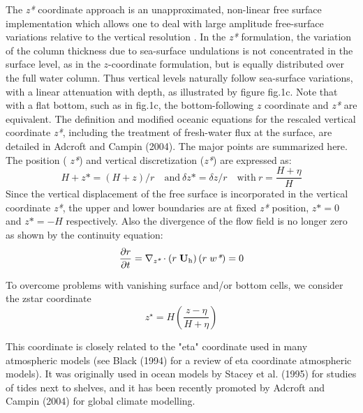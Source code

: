 \documentclass[../main/NEMO_manual]{subfiles}
\begin{document}
The \textit{z*} coordinate approach is an unapproximated, non-linear free surface implementation which allows one to
deal with large amplitude free-surface variations relative to the vertical resolution \citep{Adcroft_Campin_OM04}.
In the \textit{z*} formulation,
the variation of the column thickness due to sea-surface undulations is not concentrated in the surface level,
as in the $z$-coordinate formulation, but is equally distributed over the full water column.
Thus vertical levels naturally follow sea-surface variations, with a linear attenuation with depth,
as illustrated by figure fig.1c.
Note that with a flat bottom, such as in fig.1c, the bottom-following $z$ coordinate and \textit{z*} are equivalent.
The definition and modified oceanic equations for the rescaled vertical coordinate  \textit{z*},
including the treatment of fresh-water flux at the surface, are detailed in Adcroft and Campin (2004).
The major points are summarized here.
The position ( \textit{z*}) and vertical discretization (\textit{z*}) are expressed as:
\[
  H +  \textit{z*} = (H + z) / r \quad \text{and} \ \delta \textit{z*} = \delta z / r \quad \text{with} \ r = \frac{H+\eta} {H}
\] 
Since the vertical displacement of the free surface is incorporated in the vertical coordinate \textit{z*},
the upper and lower boundaries are at fixed  \textit{z*} position,
$\textit{z*} = 0$ and  $\textit{z*} = -H$ respectively.
Also the divergence of the flow field is no longer zero as shown by the continuity equation:
\[ 
  \frac{\partial r}{\partial t} = \nabla_{\textit{z*}} \cdot \left( r \; \rm{\bf U}_h \right)
  \left( r \; w\textit{*} \right) = 0 
\] 



To overcome problems with vanishing surface and/or bottom cells, we consider the zstar coordinate 
\[
  z^\star = H \left( \frac{z-\eta}{H+\eta} \right)
\]

This coordinate is closely related to the "eta" coordinate used in many atmospheric models
(see Black (1994) for a review of eta coordinate atmospheric models).
It was originally used in ocean models by Stacey et al. (1995) for studies of tides next to shelves,
and it has been recently promoted by Adcroft and Campin (2004) for global climate modelling.
\end{document}

